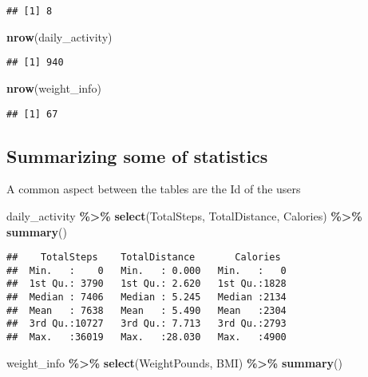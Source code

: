 \documentclass[
]{article}
\newenvironment{Shaded}{\begin{snugshade}}{\end{snugshade}}
\newcommand{\FunctionTok}[1]{\textcolor[rgb]{0.13,0.29,0.53}{\textbf{#1}}}
\newcommand{\NormalTok}[1]{#1}
\newcommand{\SpecialCharTok}[1]{\textcolor[rgb]{0.81,0.36,0.00}{\textbf{#1}}}
\begin{document}
\begin{verbatim}
## [1] 8
\end{verbatim}

\begin{Shaded}
\begin{Highlighting}[]
\FunctionTok{nrow}\NormalTok{(daily\_activity)}
\end{Highlighting}
\end{Shaded}

\begin{verbatim}
## [1] 940
\end{verbatim}

\begin{Shaded}
\begin{Highlighting}[]
\FunctionTok{nrow}\NormalTok{(weight\_info)}
\end{Highlighting}
\end{Shaded}

\begin{verbatim}
## [1] 67
\end{verbatim}

\hypertarget{summarizing-some-of-statistics}{%
\subsection{Summarizing some of
statistics}\label{summarizing-some-of-statistics}}

A common aspect between the tables are the Id of the users

\begin{Shaded}
\begin{Highlighting}[]
\NormalTok{daily\_activity }\SpecialCharTok{\%\textgreater{}\%}
  \FunctionTok{select}\NormalTok{(TotalSteps,}
\NormalTok{         TotalDistance,}
\NormalTok{         Calories) }\SpecialCharTok{\%\textgreater{}\%}
  \FunctionTok{summary}\NormalTok{()}
\end{Highlighting}
\end{Shaded}

\begin{verbatim}
##    TotalSteps    TotalDistance       Calories   
##  Min.   :    0   Min.   : 0.000   Min.   :   0  
##  1st Qu.: 3790   1st Qu.: 2.620   1st Qu.:1828  
##  Median : 7406   Median : 5.245   Median :2134  
##  Mean   : 7638   Mean   : 5.490   Mean   :2304  
##  3rd Qu.:10727   3rd Qu.: 7.713   3rd Qu.:2793  
##  Max.   :36019   Max.   :28.030   Max.   :4900
\end{verbatim}

\begin{Shaded}
\begin{Highlighting}[]
\NormalTok{weight\_info }\SpecialCharTok{\%\textgreater{}\%}
  \FunctionTok{select}\NormalTok{(WeightPounds,}
\NormalTok{         BMI) }\SpecialCharTok{\%\textgreater{}\%}
  \FunctionTok{summary}\NormalTok{()}
\end{Highlighting}
\end{Shaded}
\end{document}

